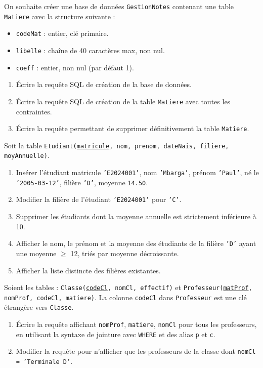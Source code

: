 \documentclass[11pt]{article}
\begin{document}
\begin{exercice}
On souhaite créer une base de données \texttt{GestionNotes} contenant une table \texttt{Matiere} avec la structure suivante :
\begin{itemize}
    \item \texttt{codeMat} : entier, clé primaire.
    \item \texttt{libelle} : chaîne de 40 caractères max, non nul.
    \item \texttt{coeff} : entier, non nul (par défaut 1).
\end{itemize}
\begin{enumerate}
    \item Écrire la requête SQL de création de la base de données.
    \item Écrire la requête SQL de création de la table \texttt{Matiere} avec toutes les contraintes.
    \item Écrire la requête permettant de supprimer définitivement la table \texttt{Matiere}.
\end{enumerate}
\end{exercice}

\begin{exercice}
Soit la table \texttt{Etudiant(\underline{matricule}, nom, prenom, dateNais, filiere, moyAnnuelle)}.
\begin{enumerate}
    \item Insérer l'étudiant matricule \texttt{'E2024001'}, nom \texttt{'Mbarga'}, prénom \texttt{'Paul'}, né le \texttt{'2005-03-12'}, filière \texttt{'D'}, moyenne \texttt{14.50}.
    \item Modifier la filière de l'étudiant \texttt{'E2024001'} pour \texttt{'C'}.
    \item Supprimer les étudiants dont la moyenne annuelle est strictement inférieure à 10.
    \item Afficher le nom, le prénom et la moyenne des étudiants de la filière \texttt{'D'} ayant une moyenne $\geq$ 12, triés par moyenne décroissante.
    \item Afficher la liste distincte des filières existantes.
\end{enumerate}
\end{exercice}

\begin{exercice}
Soient les tables :
\texttt{Classe(\underline{codeCl}, nomCl, effectif)} et \texttt{Professeur(\underline{matProf}, nomProf, codeCl, matiere)}.
La colonne \texttt{codeCl} dans \texttt{Professeur} est une clé étrangère vers \texttt{Classe}.
\begin{enumerate}
    \item Écrire la requête affichant \texttt{nomProf}, \texttt{matiere}, \texttt{nomCl} pour tous les professeurs, en utilisant la syntaxe de jointure avec \texttt{WHERE} et des alias \texttt{p} et \texttt{c}.
    \item Modifier la requête pour n'afficher que les professeurs de la classe dont \texttt{nomCl = 'Terminale D'}.
\end{enumerate}
\end{exercice}
\end{document}
